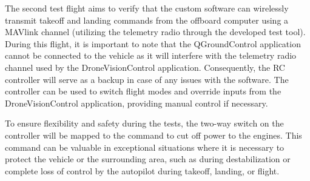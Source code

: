 The second test flight aims to verify that the custom software can wirelessly transmit takeoff and landing commands from the offboard computer using a MAVlink channel (utilizing the telemetry radio through the developed test tool). During this flight, it is important to note that the QGroundControl application cannot be connected to the vehicle as it will interfere with the telemetry radio channel used by the DroneVisionControl application. Consequently, the RC controller will serve as a backup in case of any issues with the software. The controller can be used to switch flight modes and override inputs from the DroneVisionControl application, providing manual control if necessary.


To ensure flexibility and safety during the tests, the two-way switch on the controller will be mapped to the command to cut off power to the engines. This command can be valuable in exceptional situations where it is necessary to protect the vehicle or the surrounding area, such as during destabilization or complete loss of control by the autopilot during takeoff, landing, or flight.

